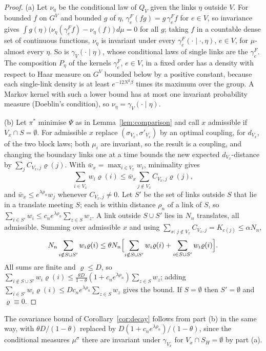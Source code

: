 \documentclass[11pt]{amsart}
\theoremstyle{definition}
\theoremstyle{remark}
\numberwithin{equation}{section}
\begin{document}
\begin{proof}
(a) Let $\nu_\eta$ be the conditional law of $Q_V$ given the links $\eta$
outside $V$. For bounded $f$ on $G^V$ and bounded $g$ of $\eta$,
$\gamma^F_e(fg)=g\,\gamma^F_ef$ for $e\in V$, so invariance gives $\int
g(\eta)\bigl(\nu_\eta(\gamma^F_ef)-\nu_\eta(f)\bigr)\,d\mu=0$ for all $g$;
taking $f$ in a countable dense set of continuous functions, $\nu_\eta$ is
invariant under every $\gamma^F_e(\cdot\mid\cdot,\eta)$, $e\in V$, for
$\mu$-almost every $\eta$. So is $\gamma_V(\cdot\mid\eta)$, whose
conditional laws of single links are the $\gamma^F_e$. The composition $P_\eta$
of the kernels $\gamma^F_e$, $e\in V$, in a fixed order has a density with
respect to Haar measure on $G^V$ bounded below by a positive constant,
because each single-link density is at least $e^{-12N^2\beta}$ times its
maximum over the group. A Markov kernel with such a lower bound has at most
one invariant probability measure (Doeblin's condition), so
$\nu_\eta=\gamma_V(\cdot\mid\eta)$.

(b) Let $\pi^*$ minimise $\Psi$ as in Lemma~\ref{lem:comparison} and call $x$
admissible if $V_x\cap S=\emptyset$. For admissible $x$ replace
$(\sigma_{V_x},\sigma'_{V_x})$ by an optimal coupling, for $d_{V_x}$, of the
two block laws; both $\mu_i$ are invariant, so the result is a coupling, and
changing the boundary links one at a time bounds the new expected
$d_{V_x}$-distance by $\sum_jC_{V_x,j}\varrho(j)$. With $\bar w_x=\max_{i\in
V_x}w_i$, minimality gives
\[
\sum_{i\in V_x}w_i\varrho(i)\le\bar w_x\sum_{j\notin V_x}C_{V_x,j}\varrho(j),
\]
and $\bar w_x\le e^{\lambda\rho_n}w_j$ whenever $C_{V_x,j}\ne0$. Let $S'$ be
the set of links outside $S$ that lie in a translate meeting $S$; each is
within distance $\rho_n$ of a link of $S$, so $\sum_{i\in S'}w_i\le
c_ne^{\lambda\rho_n}\sum_{z\in S}w_z$. A link outside $S\cup S'$ lies in
$N_n$ translates, all admissible. Summing over admissible $x$ and using
$\sum_{x:\,j\notin V_x}C_{V_x,j}=K_{c(j)}\le\alpha N_n$,
\[
N_n\sum_{i\notin S\cup S'}w_i\varrho(i)\le\theta N_n\Bigl[\sum_{i\notin
S\cup S'}w_i\varrho(i)+\sum_{i\in S\cup S'}w_i\varrho(i)\Bigr].
\]
All sums are finite and $\varrho\le D$, so $\sum_{i\notin S\cup S'}w_i
\varrho(i)\le\frac{\theta D}{1-\theta}(1+c_ne^{\lambda\rho_n})\sum_{z\in S}
w_z$; adding $\sum_{i\in S'}w_i\varrho(i)\le Dc_ne^{\lambda\rho_n}\sum_{z\in
S}w_z$ gives the bound. If $S=\emptyset$ then $S'=\emptyset$ and
$\varrho\equiv0$.
\end{proof}

The covariance bound of Corollary~\ref{cor:decay} follows from part (b) in
the same way, with $\theta D/(1-\theta)$ replaced by
$D(1+c_ne^{\lambda\rho_n})/(1-\theta)$, since the conditional measures
$\mu^\sigma$ there are invariant under $\gamma_{V_x}$ for $V_x\cap
S_H=\emptyset$ by part (a).
\end{document}
